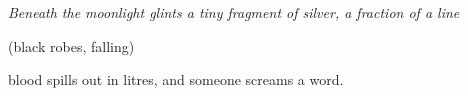 \thispagestyle{empty}
\begin{vplace}[.27]
    \itshape\small
    \parindent=0pt
    Beneath the moonlight glints a tiny fragment of silver, a fraction of a line{\el}

    \medskip
    (black robes, falling)

    \medskip
    {\el} blood spills out in litres, and someone screams a word.
\end{vplace}

